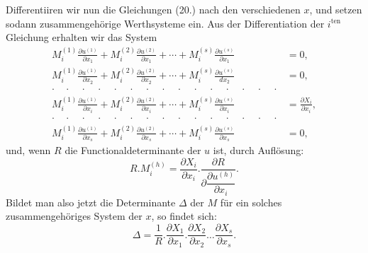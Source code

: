 \documentclass{article}
\begin{document}
Differentiiren wir nun die Gleichungen (20.) nach den verschiedenen $x$, und setzen sodann zusammengehörige Werthsysteme ein. Aus der Differentiation der $i^{\text{ten}}$ Gleichung erhalten wir das System
\[
\begin{aligned}
M_{i}^{(1)}\frac{\partial u^{(1)}}{\partial x_{1}} + M_{i}^{(2)}\frac{\partial u^{(2)}}{\partial x_{1}} + \cdots + M_{i}^{(s)}\frac{\partial u^{(s)}}{\partial x_{1}} &= 0,\\
M_{i}^{(1)}\frac{\partial u^{(1)}}{\partial x_{2}} + M_{i}^{(2)}\frac{\partial u^{(2)}}{\partial x_{2}} + \cdots + M_{i}^{(s)}\frac{\partial u^{(s)}}{dx_{2}} &= 0,\\
\cdot\quad\cdot\quad\cdot\quad\cdot\quad\cdot\quad\cdot\quad\cdot\quad\cdot\quad\cdot\quad\cdot\quad\cdot\quad\cdot\quad\cdot\quad\cdot\quad\cdot & \\
M_{i}^{(1)}\frac{\partial u^{(1)}}{\partial x_{i}} + M_{i}^{(2)}\frac{\partial u^{(2)}}{\partial x_{i}} + \cdots + M_{i}^{(s)}\frac{\partial u^{(s)}}{\partial x_{i}} &= \frac{\partial X_{i}}{\partial x_{i}},\\
\cdot\quad\cdot\quad\cdot\quad\cdot\quad\cdot\quad\cdot\quad\cdot\quad\cdot\quad\cdot\quad\cdot\quad\cdot\quad\cdot\quad\cdot\quad\cdot\quad\cdot & \\
M_{i}^{(1)}\frac{\partial u^{(1)}}{\partial x_{s}} + M_{i}^{(2)}\frac{\partial u^{(2)}}{\partial x_{s}} + \cdots + M_{i}^{(s)}\frac{\partial u^{(s)}}{\partial x_{s}} &= 0,
\end{aligned}
\]
und, wenn $R$ die Functionaldeterminante der $u$ ist, durch Auflösung:
\[
R.M_{i}^{(h)} = \frac{\partial X_{i}}{\partial x_{i}}.\frac{\partial R}{\partial\dfrac{\partial u^{(h)}}{\partial x_{i}}}.
\]
Bildet man also jetzt die Determinante $\Delta$ der $M$ für ein solches zusammengehöriges System der $x$, so findet sich:
\[
\Delta = \frac{1}{R}.\frac{\partial X_{1}}{\partial x_{1}}.\frac{\partial X_{2}}{\partial x_{2}}\ldots\frac{\partial X_{s}}{\partial x_{s}}. \tag{21.}
\]
\end{document}
